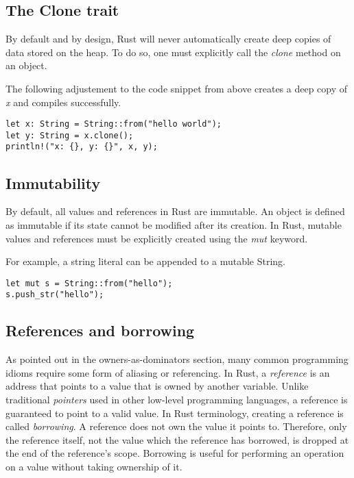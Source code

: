 \documentclass[sigplan,11pt,nonacm]{acmart}
\begin{document}
\subsection{The Clone trait}

By default and by design, Rust will never automatically create deep copies of data stored on the heap.
To do so, one must explicitly call the \emph{clone} method on an object.

The following adjustement to the code snippet from above creates a deep copy of \emph{x} and compiles successfully.
\begin{lstlisting}
let x: String = String::from("hello world");
let y: String = x.clone();
println!("x: {}, y: {}", x, y);
\end{lstlisting}


\cite{rust-book}


\subsection{Immutability}

By default, all values and references in Rust are immutable.
An object is defined as immutable if its state cannot be modified after its creation.
In Rust, mutable values and references must be explicitly created using the \emph{mut} keyword.

For example, a string literal can be appended to a mutable String.
\begin{lstlisting}
let mut s = String::from("hello");
s.push_str("hello");
\end{lstlisting}


\subsection{References and borrowing}

As pointed out in the owners-as-dominators section, many common programming idioms require some form of aliasing or referencing.
In Rust, a \emph{reference} is an address that points to a value that is owned by another variable.
Unlike traditional \emph{pointers} used in other low-level programming languages, a reference is guaranteed to point to a valid value.
In Rust terminology, creating a reference is called \emph{borrowing}.
A reference does not own the value it points to.
Therefore, only the reference itself, not the value which the reference has borrowed, is dropped at the end of the reference's scope.
Borrowing is useful for performing an operation on a value without taking ownership of it.
\end{document}
